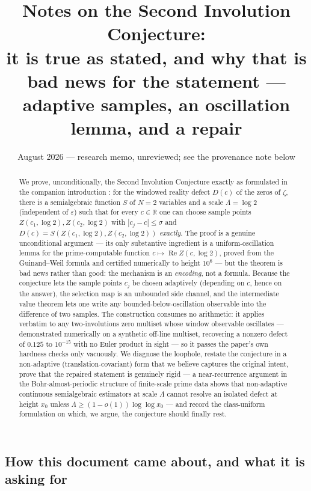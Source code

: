 \documentclass[11pt]{amsart}
\title[Notes on the Second Involution Conjecture]{Notes on the Second Involution Conjecture:\\ it is true as stated, and why that is bad news for the statement ---\\ adaptive samples, an oscillation lemma, and a repair}
\date{August 2026 --- research memo, unreviewed; see the provenance note below}
\theoremstyle{definition}
\theoremstyle{remark}
\newcommand{\RR}{\mathbb{R}}
\DeclareMathOperator{\Rre}{Re}
\begin{document}
\begin{abstract}
We prove, unconditionally, the Second Involution Conjecture exactly as formulated in the companion introduction \cite{SI}: for the windowed reality defect $D(c)$ of the zeros of $\zeta$, there is a semialgebraic function $S$ of $N=2$ variables and a scale $\Lambda=\log 2$ (independent of $\varepsilon$) such that for every $c\in\RR$ one can choose sample points $Z(c_1,\log 2), Z(c_2,\log 2)$ with $|c_j-c|\le\sigma$ and $D(c)=S(Z(c_1,\log2),Z(c_2,\log2))$ \emph{exactly}. The proof is a genuine unconditional argument --- its only substantive ingredient is a uniform-oscillation lemma for the prime-computable function $c\mapsto\Rre Z(c,\log 2)$, proved from the Guinand--Weil formula and certified numerically to height $10^6$ --- but the theorem is bad news rather than good: the mechanism is an \emph{encoding}, not a formula. Because the conjecture lets the sample points $c_j$ be chosen adaptively (depending on $c$, hence on the answer), the selection map is an unbounded side channel, and the intermediate value theorem lets one write any bounded-below-oscillation observable into the difference of two samples. The construction consumes no arithmetic: it applies verbatim to any two-involutions zero multiset whose window observable oscillates --- demonstrated numerically on a synthetic off-line multiset, recovering a nonzero defect of $0.125$ to $10^{-15}$ with no Euler product in sight --- so it passes the paper's own hardness checks only vacuously. We diagnose the loophole, restate the conjecture in a non-adaptive (translation-covariant) form that we believe captures the original intent, prove that the repaired statement is genuinely rigid --- a near-recurrence argument in the Bohr-almost-periodic structure of finite-scale prime data shows that non-adaptive continuous semialgebraic estimators at scale $\Lambda$ cannot resolve an isolated defect at height $x_0$ unless $\Lambda\ge(1-o(1))\log\log x_0$ --- and record the class-uniform formulation on which, we argue, the conjecture should finally rest.
\end{abstract}

\maketitle
\setcounter{tocdepth}{1}
\tableofcontents

\subsection*{How this document came about, and what it is asking for}
\end{document}
